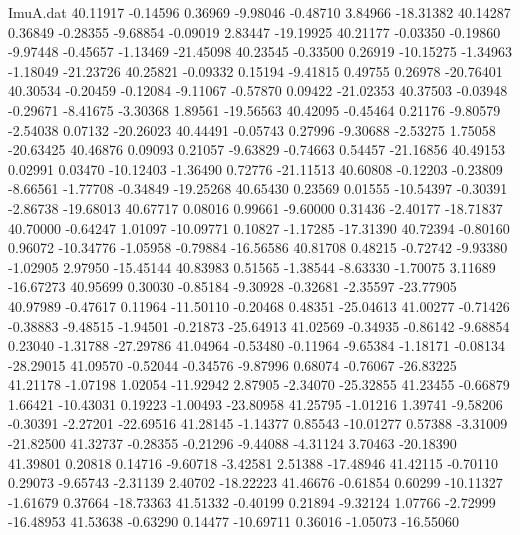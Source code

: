 \begin{filecontents}{ImuA.dat}
  40.11917   -0.14596    0.36969   -9.98046   -0.48710    3.84966  -18.31382
  40.14287    0.36849   -0.28355   -9.68854   -0.09019    2.83447  -19.19925
  40.21177   -0.03350   -0.19860   -9.97448   -0.45657   -1.13469  -21.45098
  40.23545   -0.33500    0.26919  -10.15275   -1.34963   -1.18049  -21.23726
  40.25821   -0.09332    0.15194   -9.41815    0.49755    0.26978  -20.76401
  40.30534   -0.20459   -0.12084   -9.11067   -0.57870    0.09422  -21.02353
  40.37503   -0.03948   -0.29671   -8.41675   -3.30368    1.89561  -19.56563
  40.42095   -0.45464    0.21176   -9.80579   -2.54038    0.07132  -20.26023
  40.44491   -0.05743    0.27996   -9.30688   -2.53275    1.75058  -20.63425
  40.46876    0.09093    0.21057   -9.63829   -0.74663    0.54457  -21.16856
  40.49153    0.02991    0.03470  -10.12403   -1.36490    0.72776  -21.11513
  40.60808   -0.12203   -0.23809   -8.66561   -1.77708   -0.34849  -19.25268
  40.65430    0.23569    0.01555  -10.54397   -0.30391   -2.86738  -19.68013
  40.67717    0.08016    0.99661   -9.60000    0.31436   -2.40177  -18.71837
  40.70000   -0.64247    1.01097  -10.09771    0.10827   -1.17285  -17.31390
  40.72394   -0.80160    0.96072  -10.34776   -1.05958   -0.79884  -16.56586
  40.81708    0.48215   -0.72742   -9.93380   -1.02905    2.97950  -15.45144
  40.83983    0.51565   -1.38544   -8.63330   -1.70075    3.11689  -16.67273
  40.95699    0.30030   -0.85184   -9.30928   -0.32681   -2.35597  -23.77905
  40.97989   -0.47617    0.11964  -11.50110   -0.20468    0.48351  -25.04613
  41.00277   -0.71426   -0.38883   -9.48515   -1.94501   -0.21873  -25.64913
  41.02569   -0.34935   -0.86142   -9.68854    0.23040   -1.31788  -27.29786
  41.04964   -0.53480   -0.11964   -9.65384   -1.18171   -0.08134  -28.29015
  41.09570   -0.52044   -0.34576   -9.87996    0.68074   -0.76067  -26.83225
  41.21178   -1.07198    1.02054  -11.92942    2.87905   -2.34070  -25.32855
  41.23455   -0.66879    1.66421  -10.43031    0.19223   -1.00493  -23.80958
  41.25795   -1.01216    1.39741   -9.58206   -0.30391   -2.27201  -22.69516
  41.28145   -1.14377    0.85543  -10.01277    0.57388   -3.31009  -21.82500
  41.32737   -0.28355   -0.21296   -9.44088   -4.31124    3.70463  -20.18390
  41.39801    0.20818    0.14716   -9.60718   -3.42581    2.51388  -17.48946
  41.42115   -0.70110    0.29073   -9.65743   -2.31139    2.40702  -18.22223
  41.46676   -0.61854    0.60299  -10.11327   -1.61679    0.37664  -18.73363
  41.51332   -0.40199    0.21894   -9.32124    1.07766   -2.72999  -16.48953
  41.53638   -0.63290    0.14477  -10.69711    0.36016   -1.05073  -16.55060

\end{filecontents}
